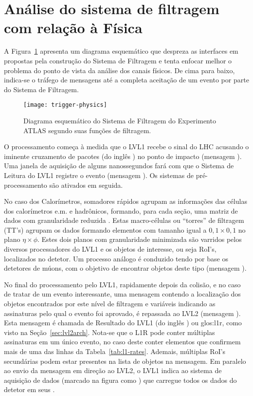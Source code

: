 \section{Análise do sistema de filtragem com relação à Física}

A Figura~\ref{fig:trigger-physics} apresenta um diagrama esquemático que
despreza as interfaces em  propostas pela construção do Sistema
de Filtragem e tenta enfocar melhor o problema do ponto de vista da análise
dos canais físicos. De cima para baixo, indica-se o tráfego de mensagens até a
completa aceitação de um evento por parte do Sistema de Filtragem.

\begin{figure}
\begin{center}
\texttt{[image: trigger-physics]}
\end{center}
\caption{Diagrama esquemático do Sistema de Filtragem do Experimento ATLAS
segundo suas funções de filtragem.}
\label{fig:trigger-physics}
\end{figure}

O processamento começa à medida que o LVL1 recebe o sinal do LHC acusando o
iminente cruzamento de pacotes (do inglês ) no ponto de
impacto (mensagem ). Uma janela de aquisição de alguns nanossegundos
fará com que o Sistema de Leitura do LVL1 registre o evento (mensagem
). Os sistemas de pré-processamento são ativados em seguida.

No caso dos Calorímetros, somadores rápidos \cite{seixas:adder} agrupam as
informações das células dos calorímetros e.m. e hadrônicos, formando, para
cada seção, uma matriz de dados com granularidade reduzida
\cite{l1-tdr}. Estas macro-células ou ``torres'' de filtragem (TT's) agrupam
os dados formando elementos com tamanho igual a $0,1\times0,1$ no plano
$\eta\times\phi$. Estes dois planos com granularidade minimizada são varridos
pelos diversos processadores do LVL1 e os objetos de interesse, ou seja RoI's,
localizados no detetor. Um processo análogo é conduzido tendo por base os
detetores de múons, com o objetivo de encontrar objetos deste tipo (mensagem
).

No final do processamento pelo LVL1, rapidamente depois da colisão, e no caso
de tratar de um evento interessante, uma mensagem contendo a localização dos
objetos encontrados por este nível de filtragem e variáveis indicando as
assinaturas pelo qual o evento foi aprovado, é repassada ao LVL2
(mensagem ). Esta mensagem é chamada de Resultado do LVL1 (do inglês
) ou \gls{glos:l1r}, como visto na
Seção~\ref{sec:lvl2arch}. Nota-se que o L1R pode conter múltiplas assinaturas
em um único evento, no caso deste conter elementos que confirmem mais de uma
das linhas da Tabela~\ref{tab:l1-rates}. Ademais, múltiplas RoI's secundárias
podem estar presentes na lista de objetos na mensagem. Em paralelo ao envio da
mensagem em direção ao LVL2, o LVL1 indica ao sistema de aquisição de dados
(marcado na figura como ) que carregue todos os dados do detetor
em seus
.

